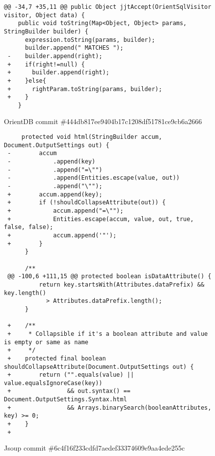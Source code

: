 \lstset{language=Java}

\begin{figure*}
\begin{lstlisting}
@@ -34,7 +35,11 @@ public Object jjtAccept(OrientSqlVisitor visitor, Object data) {
    public void toString(Map<Object, Object> params, StringBuilder builder) {
      expression.toString(params, builder);
      builder.append(" MATCHES ");
 -    builder.append(right);
 +    if(right!=null) {
 +      builder.append(right);
 +    }else{
 +      rightParam.toString(params, builder);
 +    }
    }
\end{lstlisting}
\caption{OrientDB commit \#444db817ee9404b17c1208df51781ce9cb6a2666\label{fig:orient}}
\end{figure*}

\begin{figure*}
\begin{lstlisting}
     protected void html(StringBuilder accum, Document.OutputSettings out) {
 -        accum
 -            .append(key)
 -            .append("=\"")
 -            .append(Entities.escape(value, out))
 -            .append("\"");
 +        accum.append(key);
 +        if (!shouldCollapseAttribute(out)) {
 +            accum.append("=\"");
 +            Entities.escape(accum, value, out, true, false, false);
 +            accum.append('"');
 +        }
      }
  
      /**
 @@ -100,6 +111,15 @@ protected boolean isDataAttribute() {
          return key.startsWith(Attributes.dataPrefix) && key.length() 
            > Attributes.dataPrefix.length();
      }
  
 +    /**
 +     * Collapsible if it's a boolean attribute and value is empty or same as name
 +     */
 +    protected final boolean shouldCollapseAttribute(Document.OutputSettings out) {
 +        return ("".equals(value) || value.equalsIgnoreCase(key))
 +                && out.syntax() == Document.OutputSettings.Syntax.html
 +                && Arrays.binarySearch(booleanAttributes, key) >= 0;
 +    }
 +
 \end{lstlisting}
\caption{Jsoup commit \#6c4f16f233cdfd7aedef33374609e9aa4ede255c\label{fig:jsoup}}
\end{figure*}